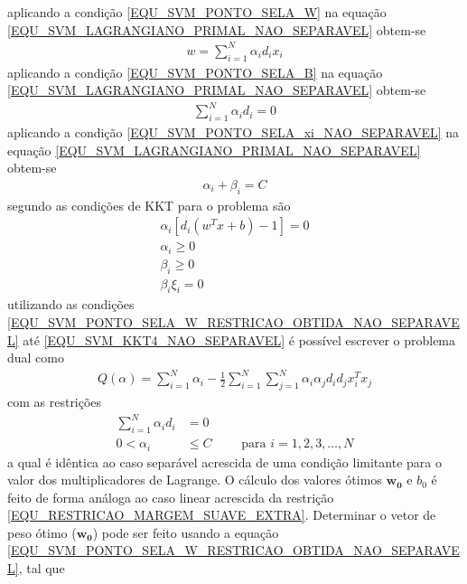 aplicando a condição \eqref{EQU_SVM_PONTO_SELA_W} na equação \eqref{EQU_SVM_LAGRANGIANO_PRIMAL_NAO_SEPARAVEL} obtem-se 
\begin{align}
w = \sum\limits_{i=1}^{N} \alpha_{i}d_{i}x_{i}  \label{EQU_SVM_PONTO_SELA_W_RESTRICAO_OBTIDA_NAO_SEPARAVEL}
\end{align}
aplicando a condição \eqref{EQU_SVM_PONTO_SELA_B} na equação \eqref{EQU_SVM_LAGRANGIANO_PRIMAL_NAO_SEPARAVEL} obtem-se 
\begin{align}
\sum\limits_{i=1}^{N} \alpha_{i}d_{i} = 0 \label{EQU_SVM_PONTO_SELA_B_RESTRICAO_OBTIDA_NAO_SEPARAVEL}
\end{align}
aplicando a condição \eqref{EQU_SVM_PONTO_SELA_xi_NAO_SEPARAVEL} na equação \eqref{EQU_SVM_LAGRANGIANO_PRIMAL_NAO_SEPARAVEL} obtem-se
\begin{align}
\alpha_{i}+\beta_{i} = C \label{EQU_SVM_PONTO_SELA_xi_RESTRICAO_OBTIDA_NAO_SEPARAVEL}
\end{align}
segundo  as condições de KKT para o problema são
\begin{align}
\alpha_{i}[d_{i}(w^{T}x + b) - 1] = 0 \label{EQU_SVM_KKT1_NAO_SEPARAVEL}\\
\alpha_{i} \geq 0 \label{EQU_SVM_KKT2_NAO_SEPARAVEL}\\
\beta_{i} \geq 0 \label{EQU_SVM_KKT3_NAO_SEPARAVEL}\\
\beta_{i}\xi_{i} = 0 \label{EQU_SVM_KKT4_NAO_SEPARAVEL}
\end{align}
utilizando as condições \eqref{EQU_SVM_PONTO_SELA_W_RESTRICAO_OBTIDA_NAO_SEPARAVEL} até \eqref{EQU_SVM_KKT4_NAO_SEPARAVEL} é possível escrever o problema dual como
\begin{align}
Q(\alpha) = \sum\limits_{i=1}^{N} \alpha_{i} - \frac{1}{2} \sum\limits_{i=1}^{N} \sum\limits_{j=1}^{N} \alpha_{i}\alpha_{j}d_{i}d_{j}x_{i}^{T}x_{j} \label{EQU_SVM_OBJETIVO_NAO_SEPARAVEL_DUAL}
\end{align}
com as restrições
\begin{align}
\sum\limits_{i=1}^{N} \alpha_{i}d_{i} &= 0 \\
0 < \alpha_{i} &\leq C	\qquad \textrm{ para } i = 1, 2, 3, \ldots, N \label{EQU_RESTRICAO_MARGEM_SUAVE_EXTRA}
\end{align}
a qual é idêntica ao caso separável acrescida de uma condição limitante para o valor dos multiplicadores de Lagrange. O cálculo dos valores ótimos \(\mathbf{w_{0}}\) e \(b_{0}\) é feito de forma análoga ao caso linear acrescida da restrição \eqref{EQU_RESTRICAO_MARGEM_SUAVE_EXTRA}. Determinar o vetor de peso ótimo (\(\mathbf{w_{0}}\)) pode ser feito usando a equação \eqref{EQU_SVM_PONTO_SELA_W_RESTRICAO_OBTIDA_NAO_SEPARAVEL}, tal que
